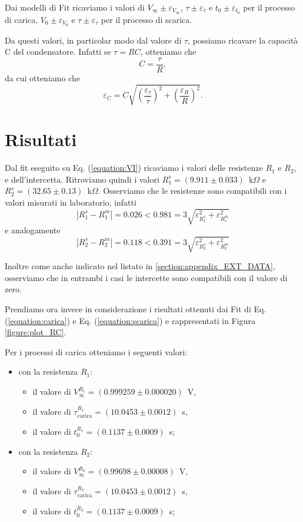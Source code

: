 \documentclass[
    reprint, 
    superscriptaddress, 
    altaffilletter, 
    amsmath, 
    amssymb, 
    a4paper
]{revtex4-2}
\newcommand{\reffig}[1]{Figura {\ref{#1}}}%
\newcommand{\refeqn}[1]{Eq. ({\ref{#1}})}%
\newcommand{\mstdErr}[1]{\varepsilon_{#1}}
\begin{document}
    Dai modelli di Fit ricaviamo i valori di $V_\infty\pm\mstdErr{V_\infty}$, $\tau\pm\mstdErr{\tau}$ e $t_0\pm\mstdErr{t_0}$ per il processo di carica, $V_0\pm\mstdErr{V_0}$ e $\tau\pm\mstdErr{\tau}$ per il processo di scarica.

    Da questi valori, in particolar modo dal valore di $\tau$, possiamo ricavare la capacità C del condensatore. Infatti se $\tau=RC$, otteniamo che \[C=\frac{\tau}{R},\] da cui otteniamo che \[\mstdErr{C}=C\sqrt{\left(\frac{\mstdErr{\tau}}{\tau}\right)^2+\left(\frac{\mstdErr{R}}{R}\right)^2}.\]

    \section{Risultati}
    \label{section:results}

    Dal fit eseguito su \refeqn{equation:VI} ricaviamo i valori delle resistenze $R_1$ e $R_2$, e dell'intercetta. Ritroviamo quindi i valori $R_1^s=(9.911\pm0.033)$~k$\Omega$ e $R_2^s=(32.65\pm0.13)$~k$\Omega$. Osserviamo che le resistenze sono compatibili con i valori misurati in laboratorio, infatti 
    \[\left|R_1^s-R_1^m\right|=0.026<0.981=3\sqrt{\mstdErr{R_1^s}^2+\mstdErr{R_1^m}^2}\]
    e analogamente
    \[\left|R_2^s-R_2^m\right|=0.118<0.391=3\sqrt{\mstdErr{R_2^s}^2+\mstdErr{R_2^m}^2}\]
    
    Inoltre come anche indicato nel listato in \ref{section:appendix_EXT_DATA}, osserviamo che in entrambi i casi le intercette sono compatibili con il valore di zero.
    
    Prendiamo ora invece in considerazione i risultati ottenuti dai Fit di \refeqn{equation:carica} e \refeqn{equation:scarica} e rappresentati in \reffig{figure:plot_RC}. 
    
    Per i processi di carica otteniamo i seguenti valori:
    \begin{itemize}
        \item con la resistenza $R_1$:
        \begin{itemize}
            \item il valore di $V_\infty^{R_1}=(0.999259\pm0.000020)$~V, 
            \item il valore di $\tau^{R_1}_{\text{carica}}=(10.0453\pm0.0012)$~s, 
            \item il valore di $t_0^{R_1}=(0.1137\pm0.0009)$~s;
        \end{itemize}
        \item con la resistenza $R_2$:
        \begin{itemize}
            \item il valore di $V_\infty^{R_2}=(0.99698\pm0.00008)$~V,
            \item il valore di $\tau^{R_2}_{\text{carica}}=(10.0453\pm0.0012)$~s,
            \item il valore di $t_0^{R_2}=(0.1137\pm0.0009)$~s;
        \end{itemize}
    \end{itemize}
    
\end{document}
